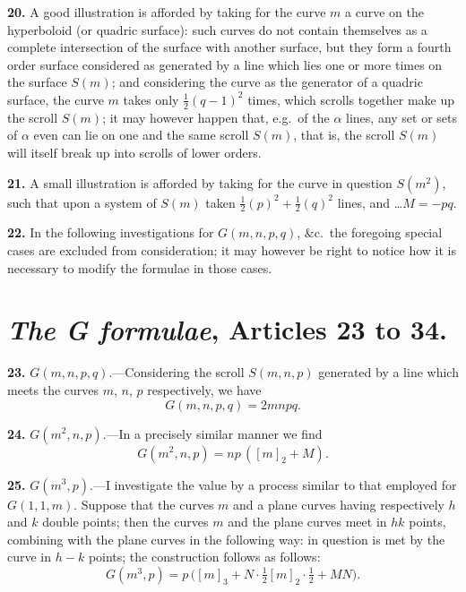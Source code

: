 \documentclass[11pt,a4paper]{article}
\begin{document}
\medskip

\textbf{20.} A good illustration is afforded by taking for the curve $m$ a curve on the hyperboloid (or quadric surface): such curves do not contain themselves as a complete intersection of the surface with another surface, but they form a fourth order surface considered as generated by a line which lies one or more times on the surface $S(m)$; and considering the curve as the generator of a quadric surface, the curve $m$ takes only $\frac{1}{2}(q-1)^2$ times, which scrolls together make up the scroll $S(m)$; it may however happen that, e.g.\ of the $\alpha$ lines, any set or sets of $\alpha$ even can lie on one and the same scroll $S(m)$, that is, the scroll $S(m)$ will itself break up into scrolls of lower orders.

\medskip

\textbf{21.} A small illustration is afforded by taking for the curve in question $S(m^2)$, such that upon a system of $S(m)$ taken $\frac{1}{2}(p)^2 + \frac{1}{2}(q)^2$ lines, and \ldots $M = -pq$.

\medskip

\textbf{22.} In the following investigations for $G(m, n, p, q)$, \&c.\ the foregoing special cases are excluded from consideration; it may however be right to notice how it is necessary to modify the formulae in those cases.

\section*{\textit{The G formulae}, Articles 23 to 34.}

\textbf{23.} $G(m, n, p, q)$.---Considering the scroll $S(m, n, p)$ generated by a line which meets the curves $m$, $n$, $p$ respectively, we have
\[
G(m, n, p, q) = 2mnpq.
\]

\medskip

\textbf{24.} $G(m^2, n, p)$.---In a precisely similar manner we find
\[
G(m^2, n, p) = np\,([m]_2 + M).
\]

\medskip

\textbf{25.} $G(m^3, p)$.---I investigate the value by a process similar to that employed for $G(1, 1, m)$. Suppose that the curves $m$ and a plane curves having respectively $h$ and $k$ double points; then the curves $m$ and the plane curves meet in $hk$ points, combining with the plane curves in the following way: in question is met by the curve in $h - k$ points; the construction follows as follows:
\[
G(m^3, p) = p\,\bigl([m]_3 + N \cdot \tfrac{1}{2}[m]_2 \cdot \tfrac{1}{2} + MN\bigr).
\]
\end{document}
